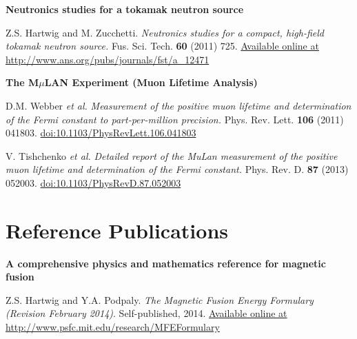 \documentclass[10pt]{article}
\begin{document}
\vspace{0.5cm}

\textbf{Neutronics studies for a tokamak neutron source} 
\begin{innerlist}
\item Z.S. Hartwig and M. Zucchetti. \textit{Neutronics studies for a
  compact, high-field tokamak neutron source.}
  Fus. Sci. Tech. \textbf{60} (2011)
  725. \href{http://www.ans.org/pubs/journals/fst/a_12471}{Available online at http://www.ans.org/pubs/journals/fst/a\_12471}
\end{innerlist}

\vspace{0.5cm}

\textbf{The M$\mu$LAN Experiment (Muon Lifetime Analysis)}
\begin{innerlist}
\item  D.M. Webber \textit{et al.} \textit{Measurement of the positive muon
  lifetime and determination of the Fermi constant to
  part-per-million precision.} Phys. Rev. Lett. \textbf{106} (2011)
  041803.
  \href{http://dx.doi.org/10.1103/PhysRevLett.106.041803}{doi:10.1103/PhysRevLett.106.041803}
  \vspace{0.2cm}

\item V. Tishchenko \textit{et al.} \textit{Detailed report of the
  MuLan measurement of the positive muon lifetime and determination of
  the Fermi constant.} Phys. Rev. D. \textbf{87} (2013)
    052003. 
    \href{http://dx.doi.org/10.1103/PhysRevD.87.052003}{doi:10.1103/PhysRevD.87.052003}

\end{innerlist}

\section{Reference Publications}
\textbf{A comprehensive physics and mathematics reference for magnetic fusion}
\begin{innerlist}
\item Z.S. Hartwig and Y.A. Podpaly. \textit{The Magnetic Fusion
  Energy Formulary (Revision February 2014)}. Self-published,
  2014. 
  \href{http://www.psfc.mit.edu/research/MFEFormulary}{Available
    online at http://www.psfc.mit.edu/research/MFEFormulary}
\end{innerlist}

\newpage
{}
\end{document}
